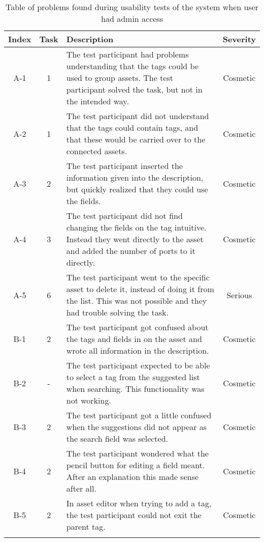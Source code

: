 \begin{longtable}[c]{| c | c | p{8cm} | c |}
    \hline
    \textbf{Index} & \textbf{Task} & \textbf{Description} & \textbf{Severity}
    \\
    \hline
    A-1 & 1 & The test participant had problems understanding that the tags could be used to group assets. The test participant solved the task, but not in the intended way. &  Cosmetic
    \\
    \hline
    A-2 & 1 & The test participant did not understand that the tags could contain tags, and that these would be carried over to the connected assets. &  Cosmetic
    \\
    \hline
    A-3 & 2 & The test participant inserted the information given into the description, but quickly realized that they could use the fields. &  Cosmetic
    \\
    \hline
    A-4 & 3 & The test participant did not find changing the fields on the tag intuitive. Instead they went directly to the asset and added the number of ports to it directly. &  Cosmetic
    \\
    \hline
    A-5 & 6 & The test participant went to the specific asset to delete it, instead of doing it from the list. This was not possible and they had trouble solving the task. &  Serious
    \\
    \hline
    B-1 & 2 & The test participant got confused about the tags and fields in on the asset and wrote all information in the description. &  Cosmetic
    \\
    \hline
    B-2 & - & The test participant expected to be able to select a tag from the suggested list when searching. This functionality was not working. & Cosmetic
    \\
    \hline
    B-3 & 2 & The test participant got a little confused when the suggestions did not appear as the search field was selected. & Cosmetic
    \\
    \hline
    B-4 & 2 & The test participant wondered what the pencil button for editing a field meant. After an explanation this made sense after all. & Cosmetic
    \\
    \hline
    B-5 & 2 & In asset editor when trying to add a tag, the test participant could not exit the parent tag. & Cosmetic
    \\
    \hline
    \caption{Table of problems found during usability tests of the system when user had admin access}
    \label{tab:AdminProblems}
\end{longtable}

